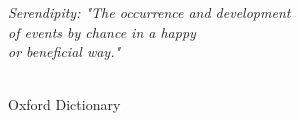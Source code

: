 \newpage

\vspace*{\fill}
{\raggedleft\vfill\itshape{
Serendipity: "The occurrence and development\\
of events by chance in a happy \\
or beneficial way."\\
\ \\
}\par
Oxford Dictionary\\
}